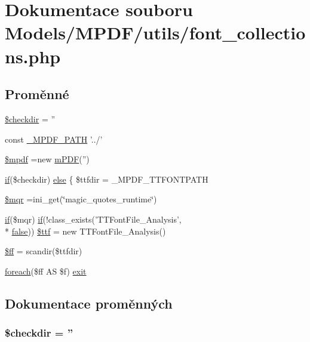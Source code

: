 \hypertarget{font__collections_8php}{\section{Dokumentace souboru Models/\-M\-P\-D\-F/utils/font\-\_\-collections.php}
\label{font__collections_8php}
}
\subsection*{Proměnné}
\begin{DoxyCompactItemize}
\item 
\hyperlink{font__collections_8php_ad773ebf7841c6538baa63f9945d7c9ca}{\$checkdir} = ''
\item 
const \hyperlink{font__collections_8php_a79734099b3f1817b14687db06cde3132}{\-\_\-\-M\-P\-D\-F\-\_\-\-P\-A\-T\-H} '../'
\item 
\hyperlink{font__collections_8php_ad028f81910d6cbab9b184d2214b3a8f8}{\$mpdf} =new \hyperlink{classm_p_d_f}{m\-P\-D\-F}('')
\item 
\hyperlink{pdf__parser_8php_af8105e84b42a9ceda5357caeb6c4760b}{if}(\$checkdir) \hyperlink{font__collections_8php_a5271a2344cca2dc08862484f40ba9273}{else} \{ \$ttfdir = \-\_\-\-M\-P\-D\-F\-\_\-\-T\-T\-F\-O\-N\-T\-P\-A\-T\-H
\item 
\hyperlink{font__collections_8php_ad04a9e91774b9f9d3044e0c2b7636ca1}{\$mqr} =ini\-\_\-get(\char`\"{}magic\-\_\-quotes\-\_\-runtime\char`\"{})
\item 
\hyperlink{pdf__parser_8php_af8105e84b42a9ceda5357caeb6c4760b}{if}(\$mqr) \hyperlink{pdf__parser_8php_af8105e84b42a9ceda5357caeb6c4760b}{if}(!class\-\_\-exists('T\-T\-Font\-File\-\_\-\-Analysis', \\*
\hyperlink{ttfontsuni_8php_afbaa04e5cc97693dc668b3c45d3dd740}{false})) \hyperlink{font__collections_8php_afff581834e571b043984b18c7bfbe4e6}{\$ttf} = new T\-T\-Font\-File\-\_\-\-Analysis()
\item 
\hyperlink{font__collections_8php_a064fd64c462dd929cd17812cf14ec09e}{\$ff} = scandir(\$ttfdir)
\item 
\hyperlink{font__names_8php_ac6e05d8eea8274a71f8f9c686e891421}{foreach}(\$ff A\-S \$f) \hyperlink{font__collections_8php_a1fe6089a8ea9dad4d98c742e8c25b329}{exit}
\end{DoxyCompactItemize}


\subsection{Dokumentace proměnných}
\hypertarget{font__collections_8php_ad773ebf7841c6538baa63f9945d7c9ca}{
\subsubsection[{\$checkdir}]{\setlength{\rightskip}{0pt plus 5cm}\$checkdir = ''}}\label{font__collections_8php_ad773ebf7841c6538baa63f9945d7c9ca}


